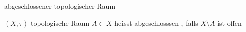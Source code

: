 \documentclass[class=article, crop=false]{standalone}
\begin{document}
\begin{zettel}{abgeschlossener topologischer Raum}
\begin{flashcard}[]{}
	\begin{definition}[abgeschlossen]
		$(X, \tau )$  topologische Raum $ A \subset X$  heisst abgeschlosssen , falls $ X \setminus A$  ist offen
	\end{definition}

\end{flashcard}
\end{zettel}
\end{document}
